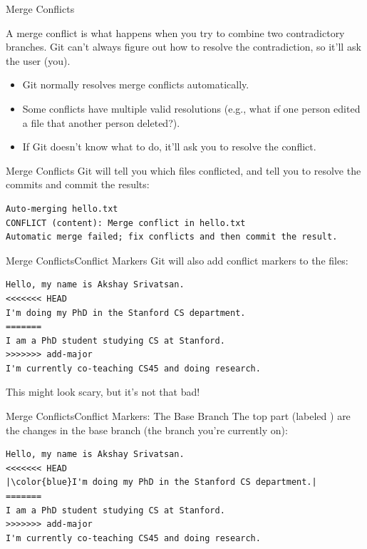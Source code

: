 \begin{frame}{Merge Conflicts}
  \begin{definition}
    A merge conflict is what happens when you try to combine two contradictory
    branches.  Git can't always figure out how to resolve the contradiction, so
    it'll ask the user (you).
  \end{definition}
  \pause
  \begin{itemize}
    \item Git normally resolves merge conflicts automatically.
      \pause
    \item Some conflicts have multiple valid resolutions (e.g., what if one person edited a file that another person deleted?).
      \pause
    \item If Git doesn't know what to do, it'll ask you to resolve the
      conflict. \pause
  \end{itemize}
\end{frame}

\begin{frame}[fragile]{Merge Conflicts}
  Git will tell you which files conflicted, and tell you to resolve the commits
  and commit the results:
  \begin{verbatim}
Auto-merging hello.txt
CONFLICT (content): Merge conflict in hello.txt
Automatic merge failed; fix conflicts and then commit the result.
  \end{verbatim}

\end{frame}

\begin{frame}[fragile]{Merge Conflicts}{Conflict Markers}
  Git will also add conflict markers to the files:
  \begin{verbatim}
Hello, my name is Akshay Srivatsan.
<<<<<<< HEAD
I'm doing my PhD in the Stanford CS department.
=======
I am a PhD student studying CS at Stanford.
>>>>>>> add-major
I'm currently co-teaching CS45 and doing research.
  \end{verbatim}
  This might look scary, but it's not that bad!
\end{frame}

\begin{frame}[fragile]{Merge Conflicts}{Conflict Markers: The Base Branch}
  The top part (labeled ) are the changes in the base branch (the
  branch you're currently on):
  \begin{verbatim}
Hello, my name is Akshay Srivatsan.
<<<<<<< HEAD
|\color{blue}I'm doing my PhD in the Stanford CS department.|
=======
I am a PhD student studying CS at Stanford.
>>>>>>> add-major
I'm currently co-teaching CS45 and doing research.
  \end{verbatim}
\end{frame}

